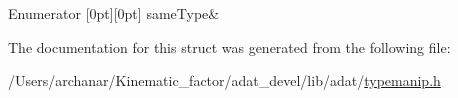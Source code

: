 \begin{DoxyEnumFields}{Enumerator}
[0pt][0pt]{}\mbox{\label{structUtil_1_1Conversion_a780137e87b1d6a9d74fbd3779f0db8a9a13c57e92754abd0dafc432097f46553d}} 
same\+Type&\\
\hline

\end{DoxyEnumFields}


The documentation for this struct was generated from the following file\+:\begin{DoxyCompactItemize}
\item 
/\+Users/archanar/\+Kinematic\+\_\+factor/adat\+\_\+devel/lib/adat/\mbox{\hyperlink{lib_2adat_2typemanip_8h}{typemanip.\+h}}\end{DoxyCompactItemize}
